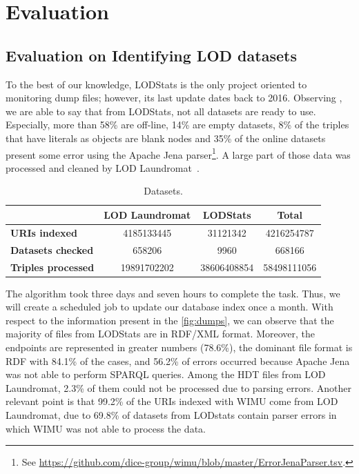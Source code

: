 \documentclass[sw]{iosart2x}
\begin{document}
\section{Evaluation}
\label{sec:eval}

\subsection{Evaluation on Identifying LOD datasets}

To the best of our knowledge, LODStats\cite{auer2012lodstats} is the only project oriented to monitoring dump files; however, its last update dates back to 2016. 
Observing , we are able to say that from LODStats, not all datasets are ready to use.
Especially, more than 58\% are off-line, 14\% are empty datasets, 8\% of the triples that have literals as objects are blank nodes and 35\% of the online datasets present some error using the Apache Jena parser\footnote{See \url{https://github.com/dice-group/wimu/blob/master/ErrorJenaParser.tsv}.}. 
A large part of those data was processed and cleaned by LOD Laundromat~\cite{beek2014lod}.


\setlength{\tabcolsep}{0.1em} %
\begin{table}[H]
	\centering
	\caption{Datasets.}
	\label{tab:lodstats}
    \scriptsize
    \begin{tabular}{lS[table-format=11.0]S[table-format=12.0]S[table-format=12.0]} %
    \toprule
    & \textbf{LOD Laundromat} & \textbf{LODStats} & \textbf{Total} \\
    \midrule
    \textbf{URIs indexed} & 4185133445 & 31121342 & 4216254787 \\
    \textbf{Datasets checked} & 658206 & 9960 & 668166 \\
    \textbf{Triples processed} & 19891702202 & 38606408854 & 58498111056 \\
    \bottomrule
    \end{tabular}
\end{table}

The algorithm took three days and seven hours to complete the task. 
Thus, we will create a scheduled job to update our database index once a month.
With respect to the information present in the \cref{fig:dumps}, we can observe that the majority of files from LODStats are in RDF/XML format.
Moreover, the endpoints are represented in greater numbers (78.6\%), the dominant file format is RDF with 84.1\% of the cases, and 56.2\% of errors occurred because Apache Jena was not able to perform SPARQL queries.
Among the HDT files from LOD Laundromat, 2.3\% of them could not be processed due to parsing errors.
Another relevant point is that 99.2\% of the URIs indexed with WIMU come from LOD Laundromat, due to 69.8\% of datasets from LODstats contain parser errors in which WIMU was not able to process the data.
\end{document}
